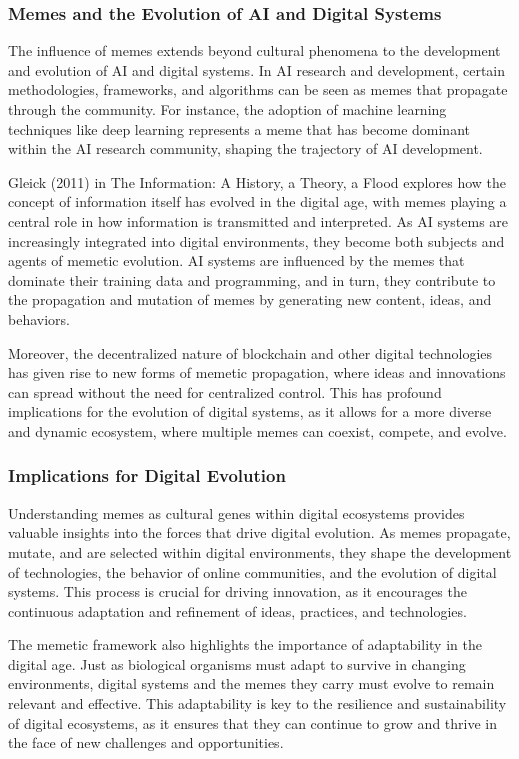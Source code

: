 \documentclass[12pt,twoside]{article}
\begin{document}
\subsubsection{Memes and the Evolution of AI and Digital Systems}

The influence of memes extends beyond cultural phenomena to the development and evolution of AI and digital systems. In AI research and development, certain methodologies, frameworks, and algorithms can be seen as memes that propagate through the community. For instance, the adoption of machine learning techniques like deep learning represents a meme that has become dominant within the AI research community, shaping the trajectory of AI development.

Gleick (2011) in The Information: A History, a Theory, a Flood explores how the concept of information itself has evolved in the digital age, with memes playing a central role in how information is transmitted and interpreted. As AI systems are increasingly integrated into digital environments, they become both subjects and agents of memetic evolution. AI systems are influenced by the memes that dominate their training data and programming, and in turn, they contribute to the propagation and mutation of memes by generating new content, ideas, and behaviors.

Moreover, the decentralized nature of blockchain and other digital technologies has given rise to new forms of memetic propagation, where ideas and innovations can spread without the need for centralized control. This has profound implications for the evolution of digital systems, as it allows for a more diverse and dynamic ecosystem, where multiple memes can coexist, compete, and evolve.

\subsubsection{Implications for Digital Evolution}

Understanding memes as cultural genes within digital ecosystems provides valuable insights into the forces that drive digital evolution. As memes propagate, mutate, and are selected within digital environments, they shape the development of technologies, the behavior of online communities, and the evolution of digital systems. This process is crucial for driving innovation, as it encourages the continuous adaptation and refinement of ideas, practices, and technologies.

The memetic framework also highlights the importance of adaptability in the digital age. Just as biological organisms must adapt to survive in changing environments, digital systems and the memes they carry must evolve to remain relevant and effective. This adaptability is key to the resilience and sustainability of digital ecosystems, as it ensures that they can continue to grow and thrive in the face of new challenges and opportunities.
\end{document}
